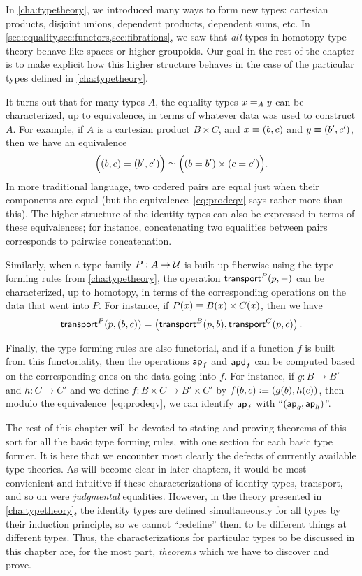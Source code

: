 In \autoref{cha:typetheory}, we introduced many ways to form new types: cartesian products, disjoint unions, dependent products, dependent sums, etc.
In \autoref{sec:equality,sec:functors,sec:fibrations}, we saw that \emph{all} types in homotopy type theory behave like spaces or higher groupoids.
Our goal in the rest of the chapter is to make explicit how this higher structure behaves in the case of the particular types defined in \autoref{cha:typetheory}.

It turns out that for many types $A$, the equality types $\id[A]xy$ can be characterized, up to equivalence, in terms of whatever data was used to construct $A$.
For example, if $A$ is a cartesian product $B\times C$, and $x\jdeq (b,c)$ and $y\jdeq(b',c')$, then we have an equivalence
\begin{equation}\label{eq:prodeqv}
  \eqv{\Big((b,c)=(b',c')\Big)}{\Big((b=b')\times (c=c')\Big)}.
\end{equation}
In more traditional language, two ordered pairs are equal just when their components are equal (but the equivalence~\eqref{eq:prodeqv} says rather more than this).
The higher structure of the identity types can also be expressed in terms of these equivalences; for instance, concatenating two equalities between pairs corresponds to pairwise concatenation.

Similarly, when a type family $P:A\to\type$ is built up fiberwise using the type forming rules from \autoref{cha:typetheory}, the operation $\transfib{P}{p}{-}$ can be characterized, up to homotopy, in terms of the corresponding operations on the data that went into $P$.
For instance, if $P(x) \jdeq B(x)\times C(x)$, then we have
\[\transfib{P}{p}{(b,c)} = \left(\transfib{B}{p}{b},\transfib{C}{p}{c}\right).\]

Finally, the type forming rules are also functorial, and if a function $f$ is built from this functoriality, then the operations $\apfunc f$ and $\apdfunc f$ can be computed based on the corresponding ones on the data going into $f$.
For instance, if $g:B\to B'$ and $h:C\to C'$ and we define $f:B\times C \to B'\times C'$ by $f(b,c)\defeq (g(b),h(c))$, then modulo the equivalence~\eqref{eq:prodeqv}, we can identify $\apfunc f$ with ``$(\apfunc g,\apfunc h)$''.

The rest of this chapter will be devoted to stating and proving theorems of this sort for all the basic type forming rules, with one section for each basic type former.
It is here that we encounter most clearly the defects of currently available type theories.
As will become clear in later chapters, it would be most convienient and intuitive if these characterizations of identity types, transport, and so on were \emph{judgmental} equalities.
However, in the theory presented in \autoref{cha:typetheory}, the identity types are defined simultaneously for all types by their induction principle, so we cannot ``redefine'' them to be different things at different types.
Thus, the characterizations for particular types to be discussed in this chapter are, for the most part, \emph{theorems} which we have to discover and prove.

